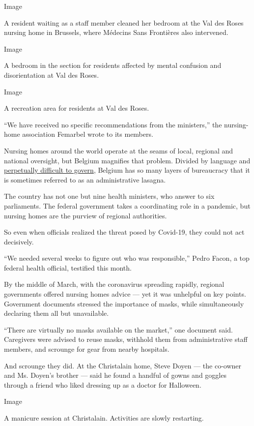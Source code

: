 Image

A resident waiting as a staff member cleaned her bedroom at the Val des
Roses nursing home in Brussels, where Médecins Sans Frontières also
intervened.

Image

A bedroom in the section for residents affected by mental confusion and
disorientation at Val des Roses.

Image

A recreation area for residents at Val des Roses.

``We have received no specific recommendations from the ministers,'' the
nursing-home association Femarbel wrote to its members.

Nursing homes around the world operate at the seams of local, regional
and national oversight, but Belgium magnifies that problem. Divided by
language and
\href{https://www.nytimes.com/2018/12/18/world/europe/right-wing-migration-belgium-collapse.html}{perpetually
difficult to govern}, Belgium has so many layers of bureaucracy that it
is sometimes referred to as an administrative lasagna.

The country has not one but nine health ministers, who answer to six
parliaments. The federal government takes a coordinating role in a
pandemic, but nursing homes are the purview of regional authorities.

So even when officials realized the threat posed by Covid-19, they could
not act decisively.

``We needed several weeks to figure out who was responsible,'' Pedro
Facon, a top federal health official, testified this month.

By the middle of March, with the coronavirus spreading rapidly, regional
governments offered nursing homes advice --- yet it was unhelpful on key
points. Government documents stressed the importance of masks, while
simultaneously declaring them all but unavailable.

``There are virtually no masks available on the market,'' one document
said. Caregivers were advised to reuse masks, withhold them from
administrative staff members, and scrounge for gear from nearby
hospitals.

And scrounge they did. At the Christalain home, Steve Doyen --- the
co-owner and Ms. Doyen's brother --- said he found a handful of gowns
and goggles through a friend who liked dressing up as a doctor for
Halloween.

Image

A manicure session at Christalain. Activities are slowly restarting.

